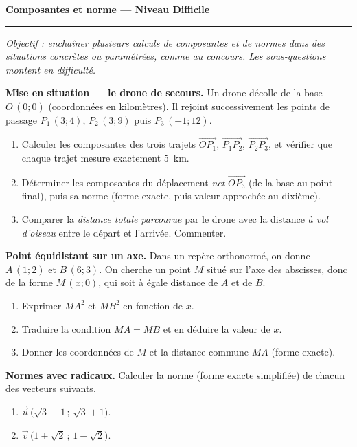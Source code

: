 \documentclass[11pt,a4paper]{article}
\newcommand{\vc}[1]{\overrightarrow{#1}}
\newcommand{\exo}[1]{\medskip\noindent{\color{primary}\bfseries\large Exercice #1.}\par\nopagebreak\smallskip}
\begin{document}
\begin{center}
{\LARGE\bfseries\color{primarydark}Composantes et norme — Niveau Difficile}\\[2pt]
{\color{primary}\rule{0.5\linewidth}{1.1pt}}
\end{center}
\vspace{1mm}
{\small\itshape Objectif : enchaîner plusieurs calculs de composantes et de normes dans des situations
concrètes ou paramétrées, comme au concours. Les sous-questions montent en difficulté.}
\vspace{2mm}

\exo{1} \textbf{Mise en situation — le drone de secours.}
Un drone décolle de la base $O\,(0;0)$ (coordonnées en kilomètres). Il rejoint successivement les
points de passage $P_1\,(3;4)$, $P_2\,(3;9)$ puis $P_3\,(-1;12)$.
\begin{enumerate}[label=\textbf{\alph*)},leftmargin=2em,itemsep=3pt]
  \item Calculer les composantes des trois trajets $\vc{OP_1}$, $\vc{P_1P_2}$, $\vc{P_2P_3}$,
        et vérifier que chaque trajet mesure exactement $5$~km.
  \item Déterminer les composantes du déplacement \emph{net} $\vc{OP_3}$ (de la base au point final),
        puis sa norme (forme exacte, puis valeur approchée au dixième).
  \item Comparer la \emph{distance totale parcourue} par le drone avec la distance \emph{à vol d'oiseau}
        entre le départ et l'arrivée. Commenter.
\end{enumerate}

\exo{2} \textbf{Point équidistant sur un axe.}
Dans un repère orthonormé, on donne $A\,(1;2)$ et $B\,(6;3)$. On cherche un point $M$ situé sur
l'axe des abscisses, donc de la forme $M\,(x;0)$, qui soit à égale distance de $A$ et de $B$.
\begin{enumerate}[label=\textbf{\alph*)},leftmargin=2em,itemsep=3pt]
  \item Exprimer $MA^2$ et $MB^2$ en fonction de $x$.
  \item Traduire la condition $MA=MB$ et en déduire la valeur de $x$.
  \item Donner les coordonnées de $M$ et la distance commune $MA$ (forme exacte).
\end{enumerate}

\exo{3} \textbf{Normes avec radicaux.}
Calculer la norme (forme exacte simplifiée) de chacun des vecteurs suivants.
\begin{enumerate}[label=\textbf{\alph*)},leftmargin=2em,itemsep=3pt]
  \item $\vec{u}\,\bigl(\sqrt3-1\,;\,\sqrt3+1\bigr)$.
  \item $\vec{v}\,\bigl(1+\sqrt2\,;\,1-\sqrt2\bigr)$.
\end{enumerate}
\end{document}
